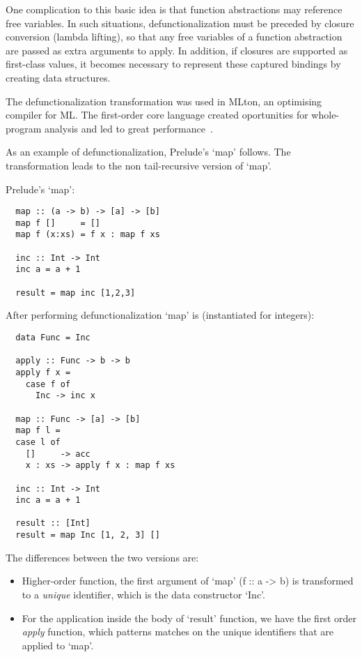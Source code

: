\documentclass[diploma]{softlab-thesis}
\begin{document}
One complication to this basic idea is that function abstractions may reference free variables. In such situations, 
defunctionalization must be preceded by closure conversion (lambda lifting), so that any free variables of a function 
abstraction are passed as extra arguments to apply. In addition, if closures are supported as first-class values, 
it becomes necessary to represent these captured bindings by creating data structures.

The defunctionalization transformation was used in MLton, an optimising compiler for ML. The first-order
core language created oportunities for whole-program analysis and led to great performance~\cite{mlton}.

As an example of defunctionalization, Prelude's `map' follows. The transformation leads to 
the non tail-recursive version of `map'.

Prelude's `map':

\begin{verbatim}
  map :: (a -> b) -> [a] -> [b]
  map f []     = []
  map f (x:xs) = f x : map f xs

  inc :: Int -> Int 
  inc a = a + 1
  
  result = map inc [1,2,3]
\end{verbatim}

After performing defunctionalization `map' is (instantiated for integers):
\begin{verbatim}
  data Func = Inc 

  apply :: Func -> b -> b
  apply f x =
    case f of
      Inc -> inc x

  map :: Func -> [a] -> [b]
  map f l =
  case l of
    []     -> acc
    x : xs -> apply f x : map f xs

  inc :: Int -> Int 
  inc a = a + 1

  result :: [Int]
  result = map Inc [1, 2, 3] []
\end{verbatim}

The differences between the two versions are:
\begin{itemize}
  \item Higher-order function, the first argument of `map' (f :: a -> b) is 
  transformed to a \textit{unique} identifier, which is the data constructor `Inc'.
  \item For the application inside the body of `result' function, we have the first order \textit{apply}
  function, which patterns matches on the unique identifiers that are applied to `map'.
\end{itemize}
\end{document}
